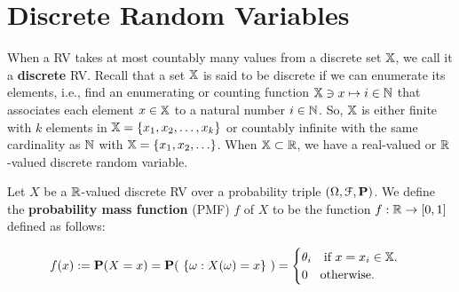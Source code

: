 \section{Discrete Random Variables}

When a RV takes at most countably many values from a discrete set $\mathbb{X}$, we call it a {\bf discrete} RV.  
Recall that a set $\mathbb{X}$ is said to be discrete if we can enumerate its elements, i.e., find an enumerating or counting function $\mathbb{X} \ni x \mapsto i \in\mathbb{N}$ that associates each element $x \in \mathbb{X}$ to a natural number $i \in \mathbb{N}$. 
So, $\mathbb{X}$ is either finite with $k$ elements in $\mathbb{X} = \{x_1,x_2,\ldots,x_k\}$ or countably infinite with the same cardinality as $\mathbb{N}$ with $\mathbb{X} = \{x_1,x_2,\ldots\}$. 
When $\mathbb{X} \subset \mathbb{R}$, we have a real-valued or $\mathbb{R}$-valued discrete random variable.

\begin{definition}
Let $X$ be a $\mathbb{R}$-valued discrete RV over a probability triple $(\Omega, \mathcal{F},\mathbf{P})$.  
We define the {\bf probability mass function} (PMF) $f$ of $X$ to be the function 
$f : \mathbb{R} \rightarrow [0,1]$ defined as follows:
\begin{framed}
\begin{equation}\label{Eq:DiscretePMF}
f(x) := \mathbf{P}(X=x) = \mathbf{P}( \ \{\omega: X(\omega) = x\} \ ) = 
\begin{cases}
\theta_i \quad \text{if $x=x_i \in \mathbb{X}$.}\\
0 \quad \text{otherwise}. 
\end{cases}
\end{equation}
\end{framed}
\end{definition}

